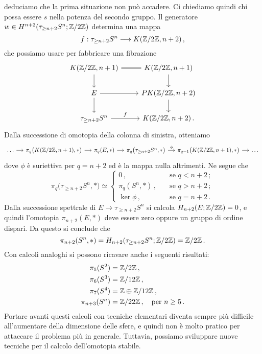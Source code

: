 deduciamo che la prima situazione non può accadere. Ci chiediamo quindi chi possa essere $s$
nella potenza del secondo gruppo. Il generatore $w \in H^{n+2}(\tau_{\ge n+2}S^{n}; {\mathbb Z}/2{\mathbb Z})$
determina una mappa
\begin{equation*}
	f : \tau_{\ge n+2} S^{n} \longrightarrow K({\mathbb Z}/2{\mathbb Z}, n+2)\,,
\end{equation*}
che possiamo usare per fabbricare una fibrazione
\begin{equation*}
	\begin{tikzcd}
		K(\Z/2\Z, n+1) \ar[r, equals] \ar[d] & K(\Z/2\Z, n+1) \ar[d] \\
		E \ar[r] \ar[d] & PK(\Z/2\Z, n+2) \ar[d] \\
		\tau_{\ge n+2} S^{n} \ar[r, "f"] & K(\Z/2\Z, n+2)\,.
	\end{tikzcd}
\end{equation*}
Dalla successione di omotopia della colonna di sinistra,
otteniamo
\begin{equation*}
	\begin{tikzcd}[column sep=small]
		\dots \ar[r] &
		\pi_{q}\big(K(\Z/2\Z, n+1),\ast \big) \ar[r]
		& \pi_{q}(E, \ast) \ar[r]
		& \pi_{q}\big(\tau_{\ge n+2} S^{n}, \ast \big) \ar[r, "\phi"]
		& \pi_{q-1}\big(K(\Z/2\Z, n+1),\ast \big) \ar[r] & \dots
	\end{tikzcd}
\end{equation*}
dove $\phi$ è suriettiva per $q=n+2$ ed è la mappa nulla altrimenti.
Ne segue che
\begin{equation*}
	\pi_{q}\big(\tau_{\ge n+2} S^{n}, \ast \big) \simeq
	\begin{cases}
		0\,, \quad &\text{se } q < n+2\,; \\
		\pi_{q}(S^{n}, \ast)\,, \quad &\text{se } q > n+2\,; \\
		\ker \phi\,, \quad &\text{se } q=n+2\,.
	\end{cases}
\end{equation*}
Dalla successione spettrale di $E \to \tau_{\ge n+2} S^{n}$
si calcola $H_{n+2}(E; {\mathbb Z}/2{\mathbb Z})=0$, e quindi l'omotopia $\pi_{n+2}(E, \ast)$
deve essere zero oppure un gruppo di ordine dispari.
Da questo si conclude che
\begin{equation*}
	\pi_{n+2}(S^{n}, \ast) = H_{n+2}(\tau_{\ge n+2}S^{n}; {\mathbb Z}/2{\mathbb Z}) = {\mathbb Z}/2{\mathbb Z}\,.
\end{equation*}
Con calcoli analoghi si possono ricavare anche i seguenti risultati:
\begin{align*}
	\pi_{5}(S^{2}) &= {\mathbb Z}/2{\mathbb Z}\,, \\
	\pi_{6}(S^{3}) &= {\mathbb Z}/12{\mathbb Z}\,, \\
	\pi_{7}(S^{4}) &= {\mathbb Z} \oplus {\mathbb Z}/12{\mathbb Z}\,, \\
	\pi_{n+3}(S^{n}) &= {\mathbb Z}/22{\mathbb Z}\,, \quad \text{per } n \ge 5\,.
\end{align*}
Portare avanti questi calcoli con tecniche elementari diventa sempre più difficile
all'aumentare della dimensione delle sfere, e quindi non è molto pratico
per attaccare il problema più in generale.
Tuttavia, possiamo sviluppare nuove tecniche per il
calcolo dell'omotopia stabile.

